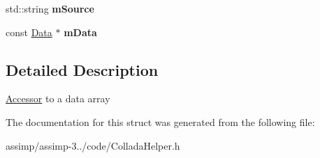 \begin{DoxyCompactItemize}
\item 
\hypertarget{struct_assimp_1_1_collada_1_1_accessor_afe1efa8c61a115c14a8747ebaaa3b4fc}{std\+::string {\bfseries m\+Source}}\label{struct_assimp_1_1_collada_1_1_accessor_afe1efa8c61a115c14a8747ebaaa3b4fc}

\item 
\hypertarget{struct_assimp_1_1_collada_1_1_accessor_ac7c123aa03129cc7de64471c3a83f71e}{const \hyperlink{struct_assimp_1_1_collada_1_1_data}{Data} $\ast$ {\bfseries m\+Data}}\label{struct_assimp_1_1_collada_1_1_accessor_ac7c123aa03129cc7de64471c3a83f71e}

\end{DoxyCompactItemize}


\subsection{Detailed Description}
\hyperlink{struct_assimp_1_1_collada_1_1_accessor}{Accessor} to a data array 

The documentation for this struct was generated from the following file\+:\begin{DoxyCompactItemize}
\item 
assimp/assimp-\/3../code/Collada\+Helper.\+h\end{DoxyCompactItemize}

